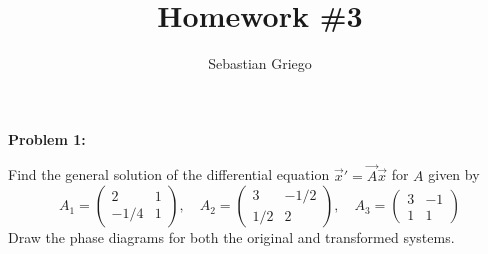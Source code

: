 \documentclass[12pt]{article}
\newenvironment{problem}[1]{
    \textbf{Problem #1:}
}{
    \rmfamily \vspace{1em}
}
\begin{document}
\title{Homework \#3}  %
\author{Sebastian Griego}  %
\maketitle

\begin{problem}{1}
    Find the general solution of the differential equation \(\vec{x}' = \vec{A}\vec{x}\) for \(A\) given by
    \[
        A_1 =\begin{pmatrix}
            2 & 1 \\
            -1/4 & 1
        \end{pmatrix}, \quad
        A_2 = \begin{pmatrix}
            3 & -1/2 \\
            1/2 & 2
        \end{pmatrix}, \quad
        A_3 = \begin{pmatrix}
            3 & -1 \\
            1 & 1
        \end{pmatrix}
    \]
    Draw the phase diagrams for both the original and transformed systems.
\end{problem}
\end{document}
